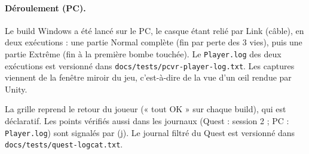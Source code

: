 \documentclass[11pt,a4paper]{article}
\newcommand{\fichier}[1]{\texttt{\small #1}}
\begin{document}
\paragraph{Déroulement (PC).} Le build Windows a été lancé sur le PC, le casque étant relié par Link
(câble), en deux exécutions : une partie Normal complète (fin par perte des 3 vies), puis une partie
Extrême (fin à la première bombe touchée). Le \fichier{Player.log} des deux exécutions est versionné
dans \fichier{docs/tests/pcvr-player-log.txt}. Les captures viennent de la fenêtre miroir du jeu,
c'est-à-dire de la vue d'un œil rendue par Unity.

La grille reprend le retour du joueur (« tout OK » sur chaque build), qui est déclaratif. Les points
vérifiés aussi dans les journaux (Quest : session 2 ; PC : \fichier{Player.log}) sont signalés par (j).
Le journal filtré du Quest est versionné dans \fichier{docs/tests/quest-logcat.txt}.
\end{document}
